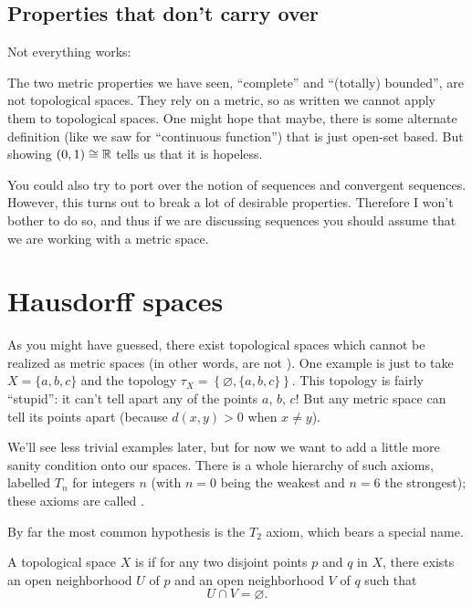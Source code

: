 \subsection{Properties that don't carry over}
Not everything works:

\begin{remark}
	The two metric properties we have seen,
	``complete'' and ``(totally) bounded'', are not topological spaces.
	They rely on a metric,
	so as written we cannot apply them to topological spaces.
	One might hope that maybe,
	there is some alternate definition (like we saw for ``continuous function'')
	that is just open-set based.
	But  showing $(0,1) \cong \mathbb R$
	tells us that it is hopeless.
\end{remark}

\begin{remark}
	You could also try to port over the notion
	of sequences and convergent sequences.
	However, this turns out to break a lot of desirable properties.
	Therefore I won't bother to do so,
	and thus if we are discussing sequences you should
	assume that we are working with a metric space.
\end{remark}

\section{Hausdorff spaces}

As you might have guessed,
there exist topological spaces which cannot be realized
as metric spaces (in other words, are not ).
One example is just to take $X = \{a,b,c\}$ and the topology
$\tau_X = \left\{ \varnothing, \{a,b,c\} \right\}$.
This topology is fairly ``stupid'':
it can't tell apart any of the points $a$, $b$, $c$!
But any metric space can tell its points apart (because $d(x,y) > 0$ when $x \neq y$).

We'll see less trivial examples later,
but for now we want to add a little more sanity condition onto our spaces.
There is a whole hierarchy of such axioms, labelled $T_n$ for
integers $n$ (with $n=0$ being the weakest and $n=6$ the strongest);
these axioms are called .

By far the most common hypothesis is the $T_2$ axiom,
which bears a special name.
\begin{definition}
	A topological space $X$ is  if
	for any two disjoint points $p$ and $q$ in $X$,
	there exists an open neighborhood $U$ of $p$
	and an open neighborhood $V$ of $q$ such that
	\[ U \cap V = \varnothing. \]
\end{definition}

